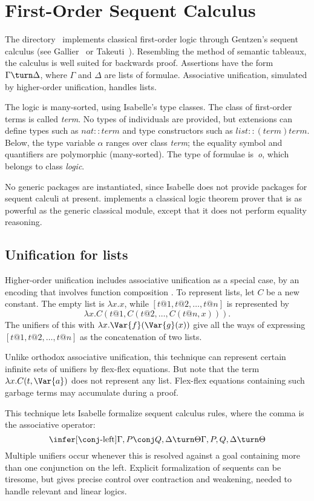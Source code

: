 \chapter{First-Order Sequent Calculus}
The directory~ implements classical first-order logic through
Gentzen's sequent calculus (see Gallier~\cite{gallier86} or
Takeuti~\cite{takeuti87}).  Resembling the method of semantic tableaux, the
calculus is well suited for backwards proof.  Assertions have the form
\(\Gamma\turn \Delta\), where \(\Gamma\) and \(\Delta\) are lists of
formulae.  Associative unification, simulated by higher-order unification,
handles lists.

The logic is many-sorted, using Isabelle's type classes.  The
class of first-order terms is called {\it term}.  No types of individuals
are provided, but extensions can define types such as $nat::term$ and type
constructors such as $list::(term)term$.  Below, the type variable $\alpha$
ranges over class {\it term\/}; the equality symbol and quantifiers are
polymorphic (many-sorted).  The type of formulae is~{\it o}, which belongs
to class {\it logic}.  

No generic packages are instantiated, since Isabelle does not provide
packages for sequent calculi at present.  \LK{} implements a classical
logic theorem prover that is as powerful as the generic classical module,
except that it does not perform equality reasoning.


\section{Unification for lists}
Higher-order unification includes associative unification as a special
case, by an encoding that involves function composition
\cite[page~37]{huet78}.  To represent lists, let $C$ be a new constant.
The empty list is $\lambda x.x$, while $[t@1,t@2,\ldots,t@n]$ is
represented by
\[ \lambda x.C(t@1,C(t@2,\ldots,C(t@n,x))).  \]
The unifiers of this with $\lambda x.\Var{f}(\Var{g}(x))$ give all the ways
of expressing $[t@1,t@2,\ldots,t@n]$ as the concatenation of two lists.

Unlike orthodox associative unification, this technique can represent certain
infinite sets of unifiers by flex-flex equations.   But note that the term
$\lambda x.C(t,\Var{a})$ does not represent any list.  Flex-flex equations
containing such garbage terms may accumulate during a proof.

This technique lets Isabelle formalize sequent calculus rules,
where the comma is the associative operator:
\[ \infer[\conj\hbox{-left}]
         {\Gamma,P\conj Q,\Delta \turn \Theta}
         {\Gamma,P,Q,\Delta \turn \Theta}  \] 
Multiple unifiers occur whenever this is resolved against a goal containing
more than one conjunction on the left.  Explicit formalization of sequents
can be tiresome, but gives precise control over contraction and weakening,
needed to handle relevant and linear logics.

